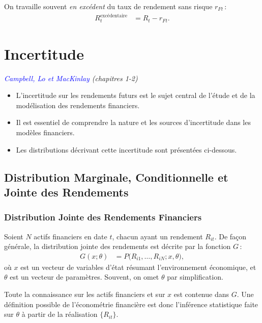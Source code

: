 \documentclass[14pt]{extarticle} %
\newcommand{\livre}[1]{\textcolor{blue}{#1}}
\begin{document}
On travaille souvent \emph{en excédent} du taux de rendement sans risque \(r_{Ft}\) :
\begin{align*}
    R_t^{\text{excédentaire}} &= R_t - r_{Ft}.
\end{align*}

\section{Incertitude}

\textit{\livre{Campbell, Lo et MacKinlay} (chapitres 1-2)}

\begin{itemize}
    \item L’incertitude sur les rendements futurs est le sujet central de l’étude et de la modélisation des rendements financiers.
    \item Il est essentiel de comprendre la nature et les sources d’incertitude dans les modèles financiers.
    \item Les distributions décrivant cette incertitude sont présentées ci-dessous.
\end{itemize}

\subsection{Distribution Marginale, Conditionnelle et Jointe des Rendements}

\subsubsection{Distribution Jointe des Rendements Financiers}

Soient \(N\) actifs financiers en date \(t\), chacun ayant un rendement \(R_{it}\). De façon générale, la distribution jointe des rendements est décrite par la fonction \(G\) :
\begin{align*}
    G(x; \theta) &= P\bigl(R_{i1}, \dots, R_{iN} ; x, \theta\bigr),
\end{align*}
où \(x\) est un vecteur de variables d’état résumant l’environnement économique, et \(\theta\) est un vecteur de paramètres. Souvent, on omet \(\theta\) par simplification.

Toute la connaissance sur les actifs financiers et sur \(x\) est contenue dans \(G\). Une définition possible de l’économétrie financière est donc l’inférence statistique faite sur \(\theta\) à partir de la réalisation \(\{R_{it}\}\).
\end{document}
